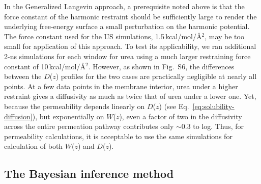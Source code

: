 In the Generalized Langevin approach, a prerequisite noted above is that the force constant 
of the harmonic restraint should be sufficiently large to render the underlying free-energy 
surface a small perturbation on the harmonic potential.  The force constant used for the US 
simulations, 1.5\,kcal/mol/\AA$^2$, may be 
too small for application of this approach.  To test its applicability, we ran additional 
2-ns simulations for each window for urea using a much larger restraining force constant 
of 10\,kcal/mol/\AA$^2$.  However, as shown in Fig.~S6, the differences 
between the $D$($z$) profiles for the two cases are practically negligible at nearly all 
points.  At a few data points in the membrane interior, urea under a higher restraint 
gives a diffusivity as much as twice that of urea under a lower one.  Yet, because 
the permeability depends linearly on $D$($z$) (see Eq.~\ref{eq:solubility-diffusion}), but 
exponentially on $W$($z$), even a factor of two in the diffusivity across the entire permeation 
pathway contributes only $\sim$0.3 to log\perm.  Thus, for permeability calculations, it is 
acceptable to use the same simulations for calculation of both $W$($z$) and $D$($z$).

\subsection*{The Bayesian inference method}



